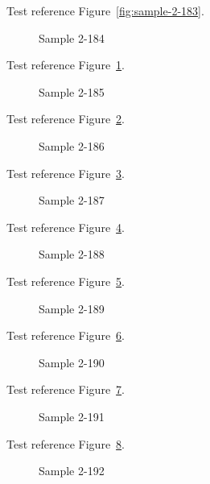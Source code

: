 Test reference Figure~\ref{fig:sample-2-183}.

\begin{figure}[tbhp]
\caption{Sample 2-184}
\label{fig:sample-2-184}
\end{figure}

Test reference Figure~\ref{fig:sample-2-184}.

\begin{figure}[tbhp]
\caption{Sample 2-185}
\label{fig:sample-2-185}
\end{figure}

Test reference Figure~\ref{fig:sample-2-185}.

\begin{figure}[tbhp]
\caption{Sample 2-186}
\label{fig:sample-2-186}
\end{figure}

Test reference Figure~\ref{fig:sample-2-186}.

\begin{figure}[tbhp]
\caption{Sample 2-187}
\label{fig:sample-2-187}
\end{figure}

Test reference Figure~\ref{fig:sample-2-187}.

\begin{figure}[tbhp]
\caption{Sample 2-188}
\label{fig:sample-2-188}
\end{figure}

Test reference Figure~\ref{fig:sample-2-188}.

\begin{figure}[tbhp]
\caption{Sample 2-189}
\label{fig:sample-2-189}
\end{figure}

Test reference Figure~\ref{fig:sample-2-189}.

\begin{figure}[tbhp]
\caption{Sample 2-190}
\label{fig:sample-2-190}
\end{figure}

Test reference Figure~\ref{fig:sample-2-190}.

\begin{figure}[tbhp]
\caption{Sample 2-191}
\label{fig:sample-2-191}
\end{figure}

Test reference Figure~\ref{fig:sample-2-191}.

\begin{figure}[tbhp]
\caption{Sample 2-192}
\label{fig:sample-2-192}
\end{figure}

